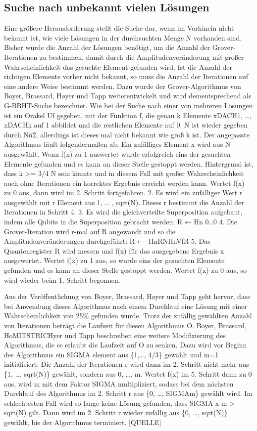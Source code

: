 \subsection{Suche nach unbekannt vielen Lösungen}
Eine größere Herausforderung stellt die Suche dar, wenn im Vorhinein nicht bekannt ist, wie viele Lösungen in der durchsuchten Menge N vorhanden sind. Bisher wurde die Anzahl der Lösungen benötigt, um die Anzahl der Grover-Iterationen zu bestimmen, damit durch die Amplitudenveränderung mit großer Wahrscheinlichkeit das gesuchte Element gefunden wird. Ist die Anzahl der richtigen Elemente vorher nicht bekannt, so muss die Anzahl der Iterationen auf eine andere Weise bestimmt werden. Dazu wurde der Grover-Algorithmus von Boyer, Brassard, Høyer und Tapp weiterentwickelt und wird dementsprechend als G-BBHT-Suche bezeichnet.
Wie bei der Suche nach einer von mehreren Lösungen ist ein Orakel Uf gegeben, mit der Funktion f, die genau k Elemente xDACH1, …, xDACHk auf 1 abbildet und die restlichen Elemente auf 0. N ist wieder gegeben durch N\=n\^2, allerdings ist dieses mal nicht bekannt wie groß k ist. Der angepasste Algorithmus läuft folgendermaßen ab. Ein zufälliges Element x wird aus N ausgewählt. Wenn f(x) zu 1 auswertet wurde erfolgreich eins der gesuchten Elemente gefunden und es kann an dieser Stelle gestoppt werden. Hintergrund ist, dass k >= 3/4 N sein könnte und in diesem Fall mit großer Wahrscheinlichkeit auch ohne Iterationen ein korrektes Ergebnis erreicht werden kann. Wertet f(x) zu 0 aus, dann wird im 2. Schritt fortgefahren.
2. Es wird ein zufälliger Wert r ausgewählt mit r Element aus 1, … , sqrt(N). Dieses r bestimmt die Anzahl der Iterationen in Schritt 4.
3. Es wird die gleichverteilte Superposition aufgebaut, indem alle Qubits in die Superposition gebracht werden:
R ← Hn 0…0
4. Die Grover-Iteration wird r-mal auf R angewandt und so die Amplitudenveränderungen durchgeführt:
R ← -HnRNHnVfR
5. Das Quantenregister R wird messen und f(x) für das ausgegebene Ergebnis x ausgewertet. Wertet f(x) zu 1 aus, so wurde eins der gesuchten Elemente gefunden und es kann an dieser Stelle gestoppt werden. Wertet f(x) zu 0 aus, so wird wieder beim 1. Schritt begonnen.

Aus der Veröffentlichung von Boyer, Brassard, Høyer und Tapp geht hervor, dass bei Anwendung dieses Algorithmus nach einem Durchlauf eine Lösung mit einer Wahrscheinlichkeit von 25\% gefunden wurde. Trotz der zufällig gewählten Anzahl von Iterationen beträgt die Laufzeit für diesen Algorithmus O.
Boyer, Brassard, HoMITSTRICHyer und Tapp beschreiben eine weitere Modifizierung des Algorithmus, die es erlaubt die Laufzeit auf O zu senken. 
Dazu wird vor Beginn des Algorithmus ein SIGMA element aus \{1,…, 4/3\} gewählt und m=1 initialisiert. Die Anzahl der Iterationen r wird dann im 2. Schritt nicht mehr aus \{1, …, sqrt(N)\} gewählt, sondern aus {0, …, m}. Wertet f(x) im 5. Schritt dann zu 0 aus, wird m mit dem Faktor SIGMA multipliziert, sodass bei dem nächsten Durchlauf des Algorithmus im 2. Schritt r aus \{0, …, SIGMAm\} gewählt wird. Im schlechtesten Fall wird so lange keine Lösung gefunden, dass SIGMA x m > sqrt(N) gilt. Dann wird im 2. Schritt r wieder zufällig aus \{0,  …, sqrt(N)\} gewählt, bis der Algorithmus terminiert. [QUELLE]


